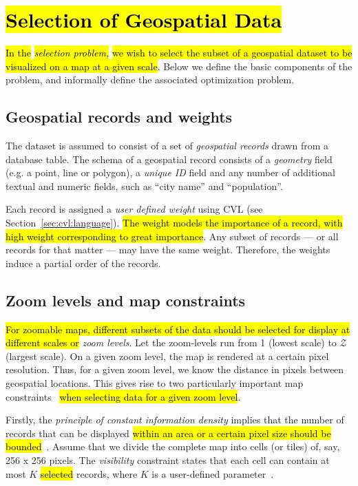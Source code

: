 \section{\hl{Selection of Geospatial Data}}
\label{sec:background}

\hl{In the }\emph{\hl{selection problem,}}\hl{ we wish to select the subset of a geospatial dataset to be visualized on a map at a given scale}. Below we define the basic components of the problem, and informally define the associated optimization problem.

\subsection{Geospatial records and weights}
\label{sec:records}

The dataset is assumed to consist of a set of \emph{geospatial records} drawn from a database table. The schema of a geospatial record consists of a \emph{geometry} field (e.g. a point, line or polygon), a \emph{unique ID} field and any number of additional textual and numeric fields, such as ``city name'' and ``population''.

Each record is assigned a \emph{user defined weight} using CVL (see Section~\ref{sec:cvl:language}). \hl{The weight models the importance of a record, with high weight corresponding to great importance}. Any subset of records --- or all records for that matter --- may have the same weight. Therefore, the weights induce a partial order of the records.

\subsection{Zoom levels and map constraints}
\label{sec:constraints}
\hl{For zoomable maps, different subsets of the data should be selected for display at different scales or }\emph{zoom levels}. Let the zoom-levels run from 1 (lowest scale) to $\mathcal{Z}$ (largest scale). On a given zoom level, the map is rendered at a certain pixel resolution. Thus, for a given zoom level, we know the distance in pixels between geospatial locations. This gives rise to two particularly important map constraints~\cite{harrie2007modelling} \hl{when selecting data for a given zoom level}.

Firstly, the \emph{principle of constant information density} implies that the number of records that can be displayed \hl{within an area or a certain pixel size should be bounded}~\cite{topfer1966principles}. Assume that we divide the complete map into cells (or tiles) of, say, 256 x 256 pixels. The \emph{visibility} constraint states that each cell can contain at most $K$ \hl{selected} records, where $K$ is a user-defined parameter~\cite{sarma2012fusiontables}.

